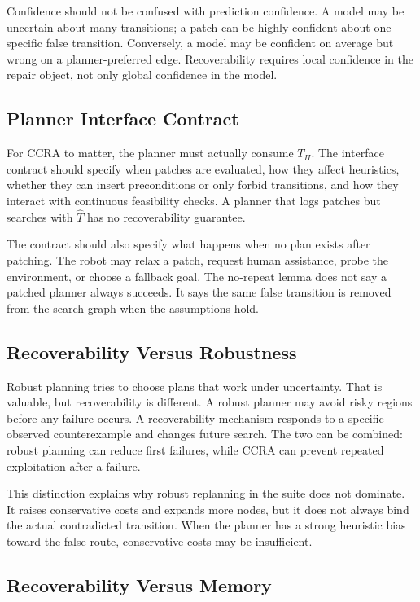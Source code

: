 \documentclass{article}
\newcommand{\ccra}{\textsc{CCRA}}
\newcommand{\model}{\hat{T}}
\newcommand{\patched}{T_{\Pi}}
\begin{document}
Confidence should not be confused with prediction confidence. A model may be
uncertain about many transitions; a patch can be highly confident about one
specific false transition. Conversely, a model may be confident on average but
wrong on a planner-preferred edge. Recoverability requires local confidence in
the repair object, not only global confidence in the model.

\subsection{Planner Interface Contract}

For \ccra{} to matter, the planner must actually consume $\patched$. The
interface contract should specify when patches are evaluated, how they affect
heuristics, whether they can insert preconditions or only forbid transitions,
and how they interact with continuous feasibility checks. A planner that logs
patches but searches with $\model$ has no recoverability guarantee.

The contract should also specify what happens when no plan exists after
patching. The robot may relax a patch, request human assistance, probe the
environment, or choose a fallback goal. The no-repeat lemma does not say a
patched planner always succeeds. It says the same false transition is removed
from the search graph when the assumptions hold.

\subsection{Recoverability Versus Robustness}

Robust planning tries to choose plans that work under uncertainty. That is
valuable, but recoverability is different. A robust planner may avoid risky
regions before any failure occurs. A recoverability mechanism responds to a
specific observed counterexample and changes future search. The two can be
combined: robust planning can reduce first failures, while \ccra{} can prevent
repeated exploitation after a failure.

This distinction explains why robust replanning in the suite does not dominate.
It raises conservative costs and expands more nodes, but it does not always bind
the actual contradicted transition. When the planner has a strong heuristic
bias toward the false route, conservative costs may be insufficient.

\subsection{Recoverability Versus Memory}
\end{document}
